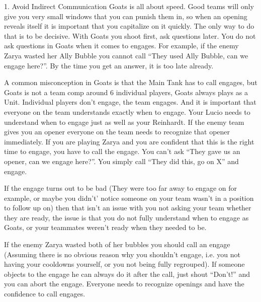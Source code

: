 1. Avoid Indirect Communication
    Goats is all about speed. Good teams will only give you very small windows that you can punish them in, so when an opening reveals itself it is important that you capitalize on it quickly. The only way to do that is to be decisive. With Goats you shoot first, ask questions later. You do not ask questions in Goats when it comes to engages. For example, if the enemy Zarya wasted her Ally Bubble you cannot call “They used Ally Bubble, can we engage here?”. By the time you get an answer, it is too late already.

A common misconception in Goats is that the Main Tank has to call engages, but Goats is not a team comp around 6 individual players, Goats always plays as a Unit. Individual players don’t engage, the team engages.
And it is important that everyone on the team understands exactly when to engage. Your Lucio needs to understand when to engage just as well as your Reinhardt. If the enemy team gives you an opener everyone on the team needs to recognize that opener immediately. If you are playing Zarya and you are confident that this is the right time to engage, you have to call the engage. You can’t ask “They gave us an opener, can we engage here?”. You simply call “They did this, go on X” and engage.

If the engage turns out to be bad (They were too far away to engage on for example, or maybe you didn't’ notice someone on your team wasn’t in a position to follow up on) then that isn’t an issue with you not asking your team whether they are ready, the issue is that you do not fully understand when to engage as Goats, or your teammates weren’t ready when they needed to be.

If the enemy Zarya wasted both of her bubbles you should call an engage (Assuming there is no obvious reason why you shouldn’t engage, i.e. you not having your cooldowns yourself, or you not being fully regrouped). If someone objects to the engage he can always do it after the call, just shout “Don’t!” and you can abort the engage.  Everyone needs to recognize openings and have the confidence to call engages.

